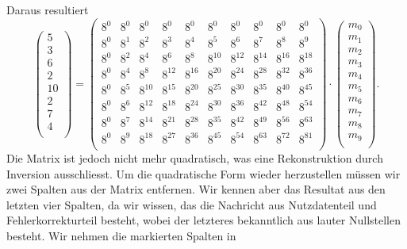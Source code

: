 Daraus resultiert
\[
\begin{pmatrix}
	5 \\ 3 \\ 6 \\ 2 \\ 10 \\ 2 \\ 7 \\ 4 \\
\end{pmatrix}
=
\begin{pmatrix}
	8^0&    8^0&    8^0&    8^0&    8^0&    8^0&    8^0&    8^0&    8^0&    8^0\\
	8^0&	8^1&	8^2&	8^3&	8^4&	8^5&	8^6&	8^7&    8^8&    8^9\\
	8^0&	8^2&	8^4&	8^6&	8^8& 8^{10}& 8^{12}& 8^{14}& 8^{16}& 8^{18}\\
	8^0&	8^4&	8^8& 8^{12}& 8^{16}& 8^{20}& 8^{24}& 8^{28}& 8^{32}& 8^{36}\\
	8^0&	8^5& 8^{10}& 8^{15}& 8^{20}& 8^{25}& 8^{30}& 8^{35}& 8^{40}& 8^{45}\\
	8^0&	8^6& 8^{12}& 8^{18}& 8^{24}& 8^{30}& 8^{36}& 8^{42}& 8^{48}& 8^{54}\\
	8^0&	8^7& 8^{14}& 8^{21}& 8^{28}& 8^{35}& 8^{42}& 8^{49}& 8^{56}& 8^{63}\\
	8^0&	8^9& 8^{18}& 8^{27}& 8^{36}& 8^{45}& 8^{54}& 8^{63}& 8^{72}& 8^{81}\\
\end{pmatrix}
\cdot
\begin{pmatrix}
	m_0 \\ m_1 \\ m_2 \\ m_3 \\ m_4 \\ m_5 \\ m_6 \\ m_7 \\ m_8 \\ m_9 \\
\end{pmatrix}
.
\]
Die Matrix ist jedoch nicht mehr quadratisch, was eine Rekonstruktion durch Inversion ausschliesst. 
Um die quadratische Form wieder herzustellen müssen wir zwei Spalten aus der Matrix entfernen.
Wir kennen aber das Resultat aus den letzten vier Spalten, da wir wissen, das die Nachricht aus Nutzdatenteil und Fehlerkorrekturteil besteht, wobei der letzteres bekanntlich aus lauter Nullstellen besteht.
Wir nehmen die markierten Spalten in
